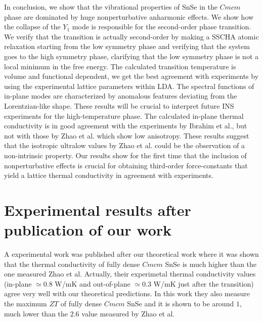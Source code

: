 In conclusion, we show that the vibrational properties of SnSe in the $Cmcm$ phase are dominated by huge nonperturbative anharmonic effects. We show how the collapse of the $Y_1$ mode is responsible for the second-order 
phase transition. We verify that the transition is actually second-order by making a SSCHA atomic relaxation starting from the low symmetry phase and verifying that the system goes to the high symmetry phase, clarifying that the low symmetry phase is not a local minimum in the free energy. The calculated transition temperature is volume and functional dependent, we get the best agreement with experiments by using the experimental lattice parameters within LDA. The spectral functions of in-plane modes are characterized by anomalous features deviating from the Lorentzian-like shape. These results will be crucial to interpret future INS experiments for the high-temperature phase. The calculated in-plane thermal conductivity is in good agreement with the experiments by Ibrahim et al.\cite{ibrahim2017reinvestigation}, but not with those by Zhao et al.\cite{zhao2014ultralow} which show low anisotropy. These results suggest that the isotropic ultralow values by Zhao et al. could be the observation of a non-intrinsic property. Our results show for the first time that the inclusion of nonperturbative effects is crucial for obtaining third-order force-constants that yield a lattice thermal conductivity in agreement with experiments.

\section{Experimental results after publication of our work}

A experimental work\cite{wei2019thermoelectric} was published after our theoretical work where it was shown that the thermal conductivity of fully dense $Cmcm$ SnSe is much higher than the one measured Zhao et al. Actually, their experimetal thermal conductivity values (in-plane $\simeq0.8$ W/mK and out-of-plane $\simeq0.3$ W/mK just after the transition) agree very well with our theoretical predictions. In this work they also measure the maximum $ZT$ of fully dense $Cmcm$ SnSe and it is shown to be around $1$, much lower than the $2.6$ value measured by Zhao et al. 
